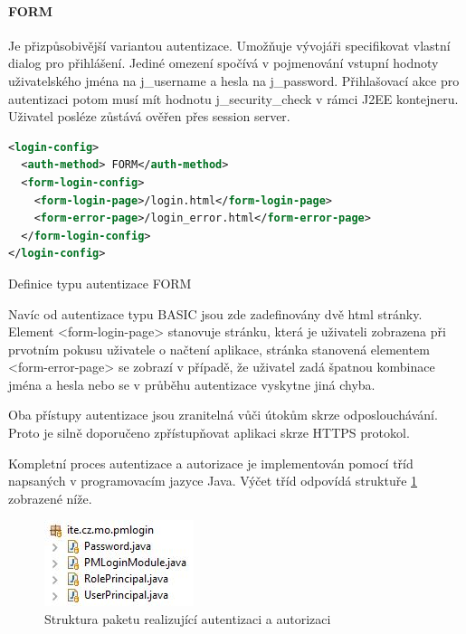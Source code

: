 \documentclass[thesis=M,czech]{FITthesis}[2012/06/26]
\begin{document}
\paragraph{FORM} Je přizpůsobivější variantou autentizace. Umožňuje vývojáři specifikovat vlastní dialog pro přihlášení. Jediné omezení spočívá v pojmenování vstupní hodnoty uživatelského jména na j\_username a hesla na j\_password. Přihlašovací akce pro autentizaci potom musí mít hodnotu j\_security\_check v rámci J2EE kontejneru. Uživatel posléze zůstává ověřen přes session server.

\begin{algorithm}[H]	
	\begin{lstlisting}[language = XML]  
<login-config> 
  <auth-method> FORM</auth-method> 
  <form-login-config> 
    <form-login-page>/login.html</form-login-page>
    <form-error-page>/login_error.html</form-error-page>
  </form-login-config> 
</login-config>
	\end{lstlisting}
	\caption{Definice typu autentizace FORM}	
	\label{code:auth_form_def}
	\small Navíc od autentizace typu BASIC jsou zde zadefinovány dvě html stránky. Element <form-login-page> stanovuje stránku, která je uživateli zobrazena při prvotním pokusu uživatele o načtení aplikace, stránka stanovená elementem <form-error-page> se zobrazí v případě, že uživatel zadá špatnou kombinace jména a hesla nebo se v průběhu autentizace vyskytne jiná chyba.
\end{algorithm}	

Oba přístupy autentizace jsou zranitelná vůči útokům skrze odposlouchávání. Proto je silně doporučeno zpřístupňovat aplikaci skrze HTTPS protokol. 

Kompletní proces autentizace a autorizace je implementován pomocí tříd napsaných v programovacím jazyce Java. Výčet tříd odpovídá struktuře \ref{img:loginmodule_structure} zobrazené níže. 

\begin{figure}[H]
	\centering
	\includegraphics[]{images/loginmodule_structure}
	\caption{Struktura paketu realizující autentizaci a autorizaci}
	\label{img:loginmodule_structure}
\end{figure}
\end{document}
